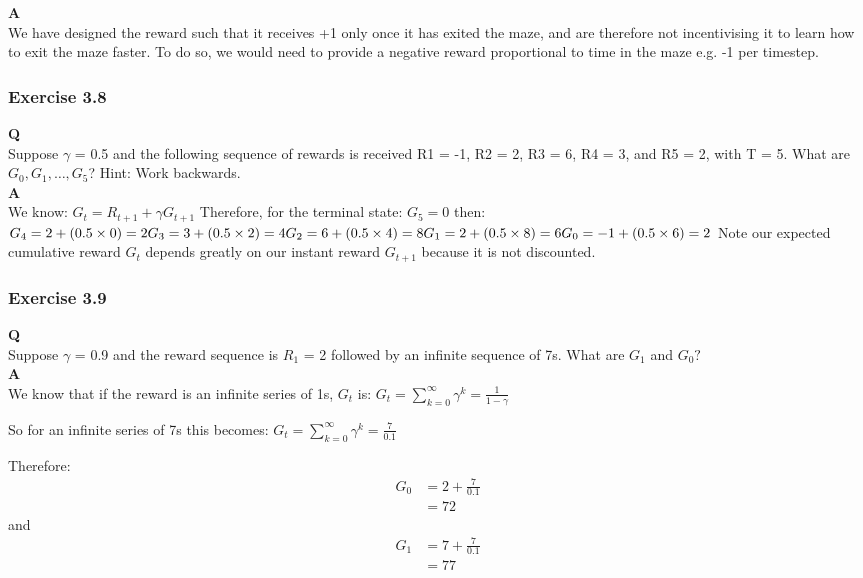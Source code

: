 \textbf{A}\\
We have designed the reward such that it receives +1 only once it has exited the maze, and are therefore not incentivising it to learn how to exit the maze faster. To do so, we would need to provide a negative reward proportional to time in the maze e.g. -1 per timestep.

\subsubsection{Exercise 3.8}
\textbf{Q}\\
Suppose \(\gamma\) = 0.5 and the following sequence of rewards is received R1 = -1, R2 = 2, R3 = 6, R4 = 3, and R5 = 2, with T = 5. What are \(G_0, G_1, \ldots, G_5\)? Hint: Work backwards.\\

\textbf{A}\\
We know:
$
G_t = R_{t+1} + \gamma G_{t+1}
$
Therefore, for the terminal state:
$
G_5 = 0
$
then:
$
G_4 = 2 +  (0.5 \times 0) = 2\\
G_3 = 3 + (0.5 \times 2) = 4\\
G_2 = 6 + (0.5 \times 4) = 8\\
G_1 = 2 + (0.5 \times 8) = 6\\
G_0 = -1 + (0.5 \times 6) = 2\\
$
Note our expected cumulative reward \(G_t\) depends greatly on our instant reward \(G_{t+1}\) because it is not  discounted.

\subsubsection{Exercise 3.9}
\textbf{Q}\\
Suppose \(\gamma\)  = 0.9 and the reward sequence is $R_1$ = 2 followed by an infinite sequence of 7s. What are $G_1$ and $G_0?$\\

\textbf{A}\\
We know that if the reward is an infinite series of 1s, $G_t$ is:
$
G_t = \sum_{k=0}^{\infty} \gamma^k = \frac{1}{1-\gamma}
$

So for an infinite series of 7s this becomes:
$
G_t = \sum_{k=0}^{\infty} \gamma^k = \frac{7}{0.1}
$

Therefore:
\begin{align}
G_0 &= 2 + \frac{7}{0.1} \\
&= 72
\end{align}
and 
\begin{align}
G_1 &= 7 + \frac{7}{0.1} \\
&= 77
\end{align}


